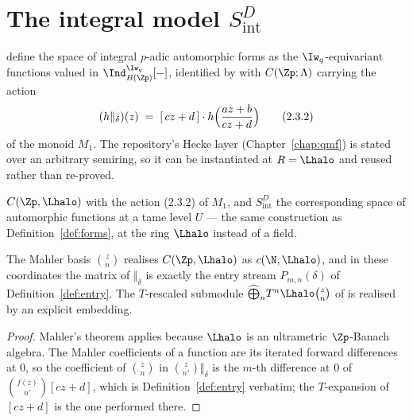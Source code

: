 \section{The integral model $S^{D}_{\mathrm{int}}$}
\label{sec:intmodel}

\cite[\S2.7]{LWX} define the space of integral $p$-adic automorphic forms as the
$\Iw_q$-equivariant functions valued in $\Ind^{\Iw_q}_{B(\Zp)}[-]$, identified by
\cite[(2.3.1)]{LWX} with $C(\Zp;\Lambda)$ carrying the action
\[
  (h\Vert_\delta)(z) \;=\; [\,cz+d\,]\cdot h\Bigl(\frac{az+b}{cz+d}\Bigr)
  \tag{2.3.2}
\]
of the monoid $M_1$.  The repository's Hecke layer (Chapter~\ref{chap:qmf}) is stated over an
arbitrary semiring, so it can be instantiated at $R = \Lhalo$ and reused rather than re-proved.

\begin{definition}
  \label{def:intforms}
  \leanok
  $C(\Zp,\Lhalo)$ with the action (2.3.2) of $M_1$, and $S^{D}_{\mathrm{int}}$ the corresponding
  space of automorphic functions at a tame level $U$ --- the same construction as
  Definition~\ref{def:forms}, at the ring $\Lhalo$ instead of a field.
\end{definition}

\begin{proposition}
  \label{prop:prop34}
  \leanok
  The Mahler basis $\binom{z}{n}$ realises $C(\Zp,\Lhalo)$ as $c(\N,\Lhalo)$, and in these
  coordinates the matrix of $\Vert_\delta$ is exactly the entry stream $P_{m,n}(\delta)$ of
  Definition~\ref{def:entry}.  The $T$-rescaled submodule
  $\widehat{\bigoplus}_n T^{n}\Lhalo\binom{z}{n}$ of \cite[(5.4.1)]{LWX} is realised by an
  explicit embedding.
\end{proposition}

\begin{proof}
  \leanok
  Mahler's theorem applies because $\Lhalo$ is an ultrametric $\Zp$-Banach algebra.  The Mahler
  coefficients of a function are its iterated forward differences at $0$, so the coefficient of
  $\binom{z}{n}$ in $\binom{z}{n'}\Vert_\delta$ is the $m$-th difference at $0$ of
  $\binom{f(z)}{n'}[cz+d]$, which is Definition~\ref{def:entry} verbatim; the $T$-expansion of
  $[cz+d]$ is the one performed there.
\end{proof}

